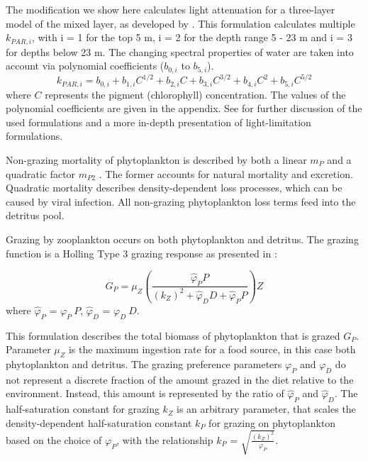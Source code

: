 \documentclass[journal abbreviation, manuscript]{copernicus}
\begin{document}
The modification we show here calculates light attenuation for a three-layer model of the mixed layer, as developed by \citet{Anderson1993APhotosynthesis}. This formulation calculates multiple $k_{PAR, i}$, with i = 1 for the top 5 \unit{m}, i = 2 for the depth range 5 - 23 \unit{m} and i = 3 for depths below 23 \unit{m}. The changing spectral properties of water are taken into account via polynomial coefficients ($b_{0,i}$ to $b_{5,i}$).
\begin{equation}
    k_{PAR, i} = b_{0,i} + b_{1,i} C^{1/2} + b_{2,i} C + b_{3,i} C^{3/2} + b_{4,i} C^2 + b_{5,i} C^{5/2}
\end{equation}
where $C$ represents the pigment (chlorophyll) concentration. The values of the polynomial coefficients are given in the appendix. See \citet{Anderson2015c} for further discussion of the used formulations and a more in-depth presentation of light-limitation formulations.

Non-grazing mortality of phytoplankton is described by both a linear $m_P$ and a quadratic factor $m_{P2}$ \citep{Yool2011Medusa-1.0:Domain}. The former accounts for natural mortality and excretion. Quadratic mortality describes density-dependent loss processes, which can be caused by viral infection. All non-grazing phytoplankton loss terms feed into the detritus pool.

Grazing by zooplankton occurs on both phytoplankton and detritus. The grazing function is a Holling Type 3 grazing response as presented in \citet{Anderson2015c}:

\begin{equation}
    G_P = \mu_Z \left( \frac{ \hat{\varphi}_P P}{(k_Z)^2 + \hat{\varphi}_D D +\hat{\varphi}_P P}  \right) Z
\end{equation}
where $\hat{\varphi}_P$ = $\varphi_P \ P$, $\hat{\varphi}_D$ = $\varphi_D \ D$.

This formulation describes the total biomass of phytoplankton that is grazed $G_P$. Parameter $\mu_Z$ is the maximum ingestion rate for a food source, in this case both phytoplankton and detritus. 
The grazing preference parameters $\varphi_P$ and $\varphi_D$ do not represent a discrete fraction of the amount grazed in the diet relative to the environment. Instead, this amount is represented by the ratio of $\hat{\varphi}_P$ and $\hat{\varphi}_D$. 
The half-saturation constant for grazing $k_Z$ is an arbitrary parameter, that scales the density-dependent half-saturation constant $k_P$ for grazing on phytoplankton based on the choice of $\varphi_P$, with the relationship $k_P$ = $\sqrt{\frac{(k_Z)^2 }{\varphi_P}}$.
\end{document}
